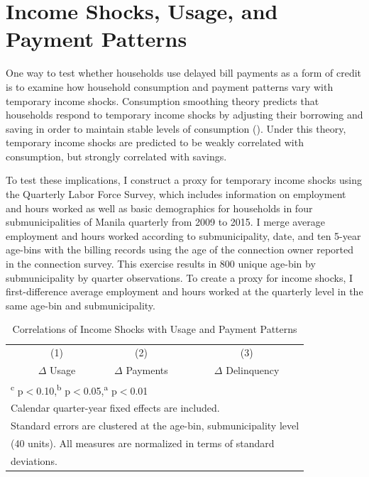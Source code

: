 \documentclass[12pt]{article}
\begin{document}
\section{Income Shocks, Usage, and Payment Patterns}

One way to test whether households use delayed bill payments as a form of credit is to examine how household consumption and payment patterns vary with temporary income shocks.  Consumption smoothing theory predicts that households respond to temporary income shocks by adjusting their borrowing and saving in order to maintain stable levels of consumption (\cite{deaton1991saving}).  Under this theory, temporary income shocks are predicted to be weakly correlated with consumption, but strongly correlated with savings.

To test these implications, I construct a proxy for temporary income shocks using the Quarterly Labor Force Survey, which includes information on employment and hours worked as well as basic demographics for households in four submunicipalities of Manila quarterly from 2009 to 2015.  I merge average employment and hours worked according to submunicipality, date, and ten 5-year age-bins with the billing records using the age of the connection owner reported in the connection survey.  This exercise results in 800 unique age-bin by submunicipality by quarter observations.  To create a proxy for income shocks, I first-difference average employment and hours worked at the quarterly level in the same age-bin and submunicipality. 

\begin{table}[!ht]
\small
\centering
\caption{Correlations of Income Shocks with Usage and Payment Patterns}\label{table:lfsanalysis}
\vspace{-2mm}
\begin{tabular}{lccc}
\toprule
 & \small (1) & \small (2)  & \small (3) \\
 & \small $\Delta$ Usage & \small  $\Delta$ Payments  & \small  $\Delta$ Delinquency \\[.5em]
 \toprule

\bottomrule
\multicolumn{4}{l}{\footnotesize \textsuperscript{c} p$<$0.10,\textsuperscript{b} p$<$0.05,\textsuperscript{a} p$<$0.01 } \\
\multicolumn{4}{l}{\footnotesize Calendar quarter-year fixed effects are included.} \\[-.2em]
\multicolumn{4}{l}{\footnotesize Standard errors are clustered at the age-bin, submunicipality level} \\[-.2em]
\multicolumn{4}{l}{\footnotesize (40 units).  All measures are normalized in terms of standard} \\[-.2em]
\multicolumn{4}{l}{\footnotesize deviations.  } 
\end{tabular}
\end{table}
\end{document}
